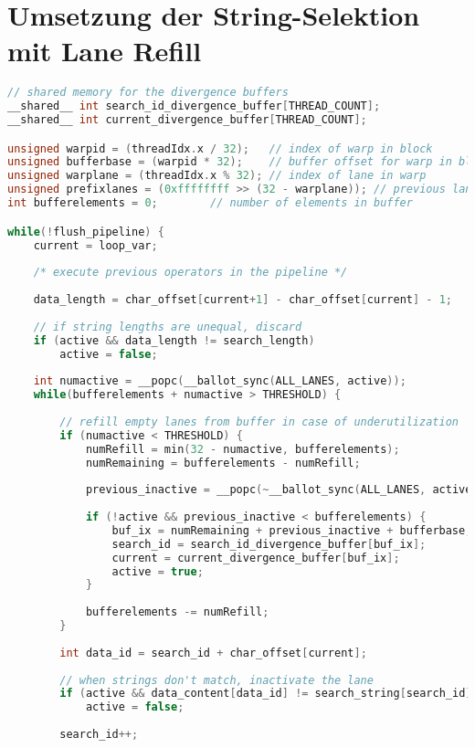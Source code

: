 \chapter{Umsetzung der String-Selektion mit Lane Refill}
\label{apx:equals_lane_refill}

\begin{lstlisting}[language=C++,
caption=Umsetzung der String-Selektion mit Lane Refill]
// shared memory for the divergence buffers
__shared__ int search_id_divergence_buffer[THREAD_COUNT];
__shared__ int current_divergence_buffer[THREAD_COUNT];

unsigned warpid = (threadIdx.x / 32);	// index of warp in block
unsigned bufferbase = (warpid * 32);    // buffer offset for warp in block
unsigned warplane = (threadIdx.x % 32); // index of lane in warp
unsigned prefixlanes = (0xffffffff >> (32 - warplane)); // previous lanes
int bufferelements = 0;        // number of elements in buffer

while(!flush_pipeline) {
	current = loop_var;
	
	/* execute previous operators in the pipeline */
	
	data_length = char_offset[current+1] - char_offset[current] - 1;
	
	// if string lengths are unequal, discard
	if (active && data_length != search_length)
		active = false;
	
	int numactive = __popc(__ballot_sync(ALL_LANES, active));
	while(bufferelements + numactive > THRESHOLD) {
	
		// refill empty lanes from buffer in case of underutilization
		if (numactive < THRESHOLD) {
			numRefill = min(32 - numactive, bufferelements);
			numRemaining = bufferelements - numRefill;
			
			previous_inactive = __popc(~__ballot_sync(ALL_LANES, active) & prefixlanes);
			
			if (!active && previous_inactive < bufferelements) {
				buf_ix = numRemaining + previous_inactive + bufferbase;
				search_id = search_id_divergence_buffer[buf_ix];
				current = current_divergence_buffer[buf_ix];
				active = true;
			}
			
			bufferelements -= numRefill;
		}
	
		int data_id = search_id + char_offset[current];
		
		// when strings don't match, inactivate the lane
		if (active && data_content[data_id] != search_string[search_id])
			active = false;
		
		search_id++;
		

\end{lstlisting}
